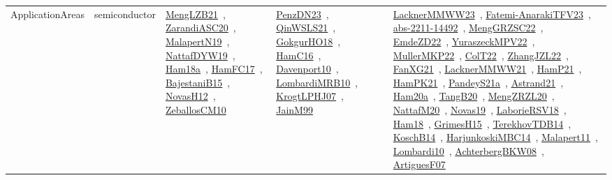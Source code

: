 {\begin{longtable}{lp{3cm}>{\raggedright\arraybackslash}p{6cm}>{\raggedright\arraybackslash}p{6cm}>{\raggedright\arraybackslash}p{8cm}}
ApplicationAreas & semiconductor & \href{../works/MengLZB21.pdf}{MengLZB21}~\cite{MengLZB21}, \href{../works/ZarandiASC20.pdf}{ZarandiASC20}~\cite{ZarandiASC20}, \href{../works/MalapertN19.pdf}{MalapertN19}~\cite{MalapertN19}, \href{../works/NattafDYW19.pdf}{NattafDYW19}~\cite{NattafDYW19}, \href{../works/Ham18a.pdf}{Ham18a}~\cite{Ham18a}, \href{../works/HamFC17.pdf}{HamFC17}~\cite{HamFC17}, \href{../works/BajestaniB15.pdf}{BajestaniB15}~\cite{BajestaniB15}, \href{../works/NovasH12.pdf}{NovasH12}~\cite{NovasH12}, \href{../works/ZeballosCM10.pdf}{ZeballosCM10}~\cite{ZeballosCM10} & \href{../works/PenzDN23.pdf}{PenzDN23}~\cite{PenzDN23}, \href{../works/QinWSLS21.pdf}{QinWSLS21}~\cite{QinWSLS21}, \href{../works/GokgurHO18.pdf}{GokgurHO18}~\cite{GokgurHO18}, \href{../works/HamC16.pdf}{HamC16}~\cite{HamC16}, \href{../works/Davenport10.pdf}{Davenport10}~\cite{Davenport10}, \href{../works/LombardiMRB10.pdf}{LombardiMRB10}~\cite{LombardiMRB10}, \href{../works/KrogtLPHJ07.pdf}{KrogtLPHJ07}~\cite{KrogtLPHJ07}, \href{../works/JainM99.pdf}{JainM99}~\cite{JainM99} & \href{../works/LacknerMMWW23.pdf}{LacknerMMWW23}~\cite{LacknerMMWW23}, \href{../works/Fatemi-AnarakiTFV23.pdf}{Fatemi-AnarakiTFV23}~\cite{Fatemi-AnarakiTFV23}, \href{../works/abs-2211-14492.pdf}{abs-2211-14492}~\cite{abs-2211-14492}, \href{../works/MengGRZSC22.pdf}{MengGRZSC22}~\cite{MengGRZSC22}, \href{../works/EmdeZD22.pdf}{EmdeZD22}~\cite{EmdeZD22}, \href{../works/YuraszeckMPV22.pdf}{YuraszeckMPV22}~\cite{YuraszeckMPV22}, \href{../works/MullerMKP22.pdf}{MullerMKP22}~\cite{MullerMKP22}, \href{../works/ColT22.pdf}{ColT22}~\cite{ColT22}, \href{../works/ZhangJZL22.pdf}{ZhangJZL22}~\cite{ZhangJZL22}, \href{../works/FanXG21.pdf}{FanXG21}~\cite{FanXG21}, \href{../works/LacknerMMWW21.pdf}{LacknerMMWW21}~\cite{LacknerMMWW21}, \href{../works/HamP21.pdf}{HamP21}~\cite{HamP21}, \href{../works/HamPK21.pdf}{HamPK21}~\cite{HamPK21}, \href{../works/PandeyS21a.pdf}{PandeyS21a}~\cite{PandeyS21a}, \href{../works/Astrand21.pdf}{Astrand21}~\cite{Astrand21}, \href{../works/Ham20a.pdf}{Ham20a}~\cite{Ham20a}, \href{../works/TangB20.pdf}{TangB20}~\cite{TangB20}, \href{../works/MengZRZL20.pdf}{MengZRZL20}~\cite{MengZRZL20}, \href{../works/NattafM20.pdf}{NattafM20}~\cite{NattafM20}, \href{../works/Novas19.pdf}{Novas19}~\cite{Novas19}, \href{../works/LaborieRSV18.pdf}{LaborieRSV18}~\cite{LaborieRSV18}, \href{../works/Ham18.pdf}{Ham18}~\cite{Ham18}, \href{../works/GrimesH15.pdf}{GrimesH15}~\cite{GrimesH15}, \href{../works/TerekhovTDB14.pdf}{TerekhovTDB14}~\cite{TerekhovTDB14}, \href{../works/KoschB14.pdf}{KoschB14}~\cite{KoschB14}, \href{../works/HarjunkoskiMBC14.pdf}{HarjunkoskiMBC14}~\cite{HarjunkoskiMBC14}, \href{../works/Malapert11.pdf}{Malapert11}~\cite{Malapert11}, \href{../works/Lombardi10.pdf}{Lombardi10}~\cite{Lombardi10}, \href{../works/AchterbergBKW08.pdf}{AchterbergBKW08}~\cite{AchterbergBKW08}, \href{../works/ArtiguesF07.pdf}{ArtiguesF07}~\cite{ArtiguesF07}\\

\end{longtable}}
